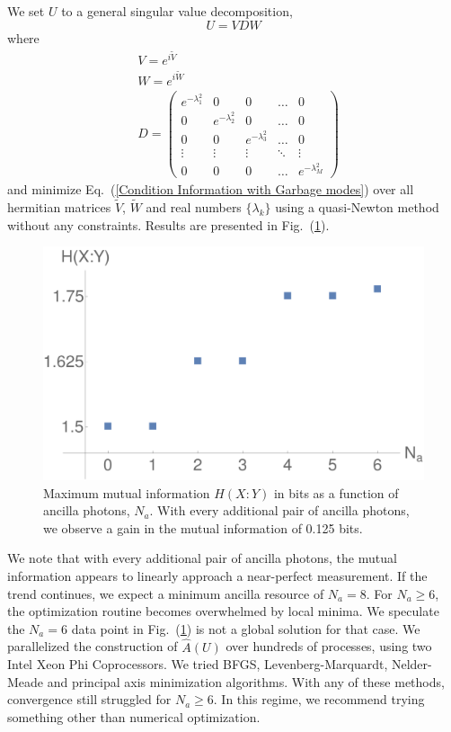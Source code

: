 \documentclass[aps,pra,twocolumn,showpacs,superscriptaddress,floatfix,10pt]{revtex4}
\begin{document}
We set $U$ to a general singular value decomposition,
\begin{equation}
	\label{Singular Value Decomposition}
	U = V D W
\end{equation}
where
\begin{eqnarray}
	& V = e^{i \tilde{V}} \\
	& W = e^{i \tilde{W}} \\
	& D =  \begin{pmatrix} e^{-\lambda^2_1} & 0 & 0 & \hdots & 0 \\ 0 & e^{-\lambda^2_2} & 0 & \hdots & 0 \\ 0 & 0 & e^{-\lambda^2_3} & \hdots & 0 \\ \vdots
	& \vdots & \vdots & \ddots & \vdots \\
	0 & 0 & 0 & \hdots & e^{-\lambda^2_M} \end{pmatrix} 
\end{eqnarray}
and minimize Eq.~(\ref{Condition Information with Garbage modes}) over all hermitian matrices $\tilde{V}$, $\tilde{W}$ and real numbers $\{\lambda_k\}$ using a quasi-Newton method without any constraints. Results are presented in Fig.~(\ref{Mutual Information Results}).
\begin{figure}[ht]
	\centering
	\includegraphics[width= 0.48 \textwidth]{./EntropyData.pdf}
	\caption{ Maximum mutual information $H(X:Y)$ in bits as a function of ancilla photons, $N_a$. With every additional pair of ancilla photons, we observe a gain in the mutual information of 0.125 bits. }
	\label{Mutual Information Results}
\end{figure}
We note that with every additional pair of ancilla photons, the mutual information appears to linearly approach a near-perfect measurement. If the trend continues, we expect a minimum ancilla resource of $N_a = 8$. For $N_a \ge 6$, the optimization routine becomes overwhelmed by local minima. We speculate the $N_a=6$ data point in Fig.~(\ref{Mutual Information Results}) is not a global solution for that case. We parallelized the construction of $\hat{A}(U)$ over hundreds of processes, using two Intel Xeon Phi Coprocessors. We tried BFGS, Levenberg-Marquardt, Nelder-Meade and principal axis minimization algorithms. With any of these methods, convergence still struggled for $N_a \ge 6$. In this regime, we recommend trying something other than numerical optimization.
\end{document}
